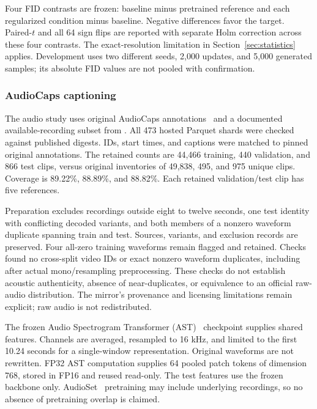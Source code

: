 \documentclass[10pt,a4paper,twocolumn]{article}
\begin{document}
Four FID contrasts are frozen: baseline minus pretrained
reference and each regularized condition minus baseline.
Negative differences favor the target.
Paired-$t$ and all 64 sign flips are reported with separate
Holm correction across these four contrasts.
The exact-resolution limitation in
Section~\ref{sec:statistics} applies.
Development uses two different seeds, 2,000 updates,
and 5,000 generated samples; its absolute FID values are
not pooled with confirmation.

\subsubsection{AudioCaps captioning}
\label{sec:audio_setup}

The audio study uses original AudioCaps
annotations~\cite{kim2019audiocaps} and a documented
available-recording subset from
.
All 473 hosted Parquet shards were checked against published
digests. IDs, start times, and captions were matched to pinned
original annotations.
The retained counts are 44,466 training, 440 validation,
and 866 test clips, versus original inventories of
49,838, 495, and 975 unique clips.
Coverage is 89.22\%, 88.89\%, and 88.82\%.
Each retained validation/test clip has five references.

Preparation excludes recordings outside eight to twelve seconds,
one test identity with conflicting decoded variants,
and both members of a nonzero waveform duplicate spanning train
and test. Sources, variants, and exclusion records are preserved.
Four all-zero training waveforms remain flagged and retained.
Checks found no cross-split video IDs or exact nonzero waveform
duplicates, including after actual mono/resampling preprocessing.
These checks do not establish acoustic authenticity, absence
of near-duplicates, or equivalence to an official raw-audio
distribution. The mirror's provenance and licensing limitations
remain explicit; raw audio is not redistributed.

The frozen Audio Spectrogram Transformer
(AST)~\cite{gong2021ast} checkpoint
supplies shared features.
Channels are averaged, resampled to 16 kHz, and limited to the
first 10.24 seconds for a single-window representation.
Original waveforms are not rewritten.
FP32 AST computation supplies 64 pooled patch tokens of
dimension 768, stored in FP16 and reused read-only.
The test features use the frozen backbone only.
AudioSet~\cite{gemmeke2017audioset} pretraining may include
underlying recordings, so no absence of pretraining overlap
is claimed.
\end{document}
